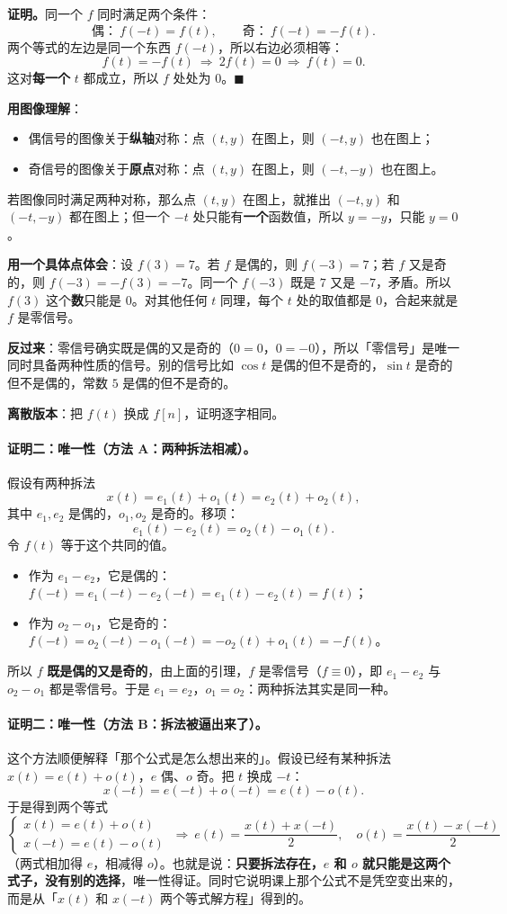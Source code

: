 \documentclass[UTF8,a4paper,11pt]{ctexart}
\begin{document}
\textbf{证明。}同一个 $f$ 同时满足两个条件：
\[
\text{偶：}\ f(-t)=f(t),\qquad \text{奇：}\ f(-t)=-f(t).
\]
两个等式的左边是同一个东西 $f(-t)$，所以右边必须相等：
\[
f(t)=-f(t)\ \Longrightarrow\ 2f(t)=0\ \Longrightarrow\ f(t)=0 .
\]
这对\textbf{每一个} $t$ 都成立，所以 $f$ 处处为 $0$。$\blacksquare$

\textbf{用图像理解}：
\begin{itemize}[nosep]
\item 偶信号的图像关于\textbf{纵轴}对称：点 $(t,y)$ 在图上，则 $(-t,y)$ 也在图上；
\item 奇信号的图像关于\textbf{原点}对称：点 $(t,y)$ 在图上，则 $(-t,-y)$ 也在图上。
\end{itemize}
若图像同时满足两种对称，那么点 $(t,y)$ 在图上，就推出 $(-t,y)$ 和 $(-t,-y)$ 都在图上；但一个 $-t$ 处只能有\textbf{一个}函数值，所以 $y=-y$，只能 $y=0$。

\textbf{用一个具体点体会}：设 $f(3)=7$。若 $f$ 是偶的，则 $f(-3)=7$；若 $f$ 又是奇的，则 $f(-3)=-f(3)=-7$。同一个 $f(-3)$ 既是 $7$ 又是 $-7$，矛盾。所以 $f(3)$ 这个\textbf{数}只能是 $0$。对其他任何 $t$ 同理，每个 $t$ 处的取值都是 $0$，合起来就是 $f$ 是零信号。

\textbf{反过来}：零信号确实既是偶的又是奇的（$0=0$，$0=-0$），所以「零信号」是唯一同时具备两种性质的信号。别的信号比如 $\cos t$ 是偶的但不是奇的，$\sin t$ 是奇的但不是偶的，常数 $5$ 是偶的但不是奇的。

\textbf{离散版本}：把 $f(t)$ 换成 $f[n]$，证明逐字相同。

\paragraph{证明二：唯一性（方法 A：两种拆法相减）。}假设有两种拆法
\[
x(t)=e_1(t)+o_1(t)=e_2(t)+o_2(t),
\]
其中 $e_1,e_2$ 是偶的，$o_1,o_2$ 是奇的。移项：
\[
e_1(t)-e_2(t)=o_2(t)-o_1(t).
\]
令 $f(t)$ 等于这个共同的值。
\begin{itemize}[nosep]
\item 作为 $e_1-e_2$，它是偶的：$f(-t)=e_1(-t)-e_2(-t)=e_1(t)-e_2(t)=f(t)$；
\item 作为 $o_2-o_1$，它是奇的：$f(-t)=o_2(-t)-o_1(-t)=-o_2(t)+o_1(t)=-f(t)$。
\end{itemize}
所以 $f$ \textbf{既是偶的又是奇的}，由上面的引理，$f$ 是零信号（$f\equiv0$），即 $e_1-e_2$ 与 $o_2-o_1$ 都是零信号。于是 $e_1=e_2$，$o_1=o_2$：两种拆法其实是同一种。

\paragraph{证明二：唯一性（方法 B：拆法被逼出来了）。}这个方法顺便解释「那个公式是怎么想出来的」。假设已经有某种拆法 $x(t)=e(t)+o(t)$，$e$ 偶、$o$ 奇。把 $t$ 换成 $-t$：
\[
x(-t)=e(-t)+o(-t)=e(t)-o(t).
\]
于是得到两个等式
\[
\begin{cases}x(t)=e(t)+o(t)\\x(-t)=e(t)-o(t)\end{cases}
\ \Longrightarrow\
e(t)=\frac{x(t)+x(-t)}{2},\quad o(t)=\frac{x(t)-x(-t)}{2}
\]
（两式相加得 $e$，相减得 $o$）。也就是说：\textbf{只要拆法存在，$e$ 和 $o$ 就只能是这两个式子，没有别的选择}，唯一性得证。同时它说明课上那个公式不是凭空变出来的，而是从「$x(t)$ 和 $x(-t)$ 两个等式解方程」得到的。
\end{document}
